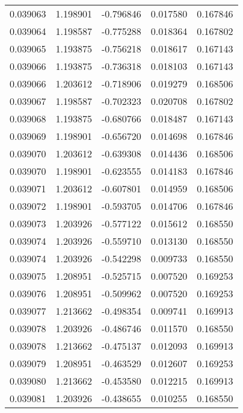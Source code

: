 \begin{tabular}{lrrrr}
0.039063    &  1.198901 & -0.796846 &  0.017580 &             0.167846 \\
0.039064    &  1.198587 & -0.775288 &  0.018364 &             0.167802 \\
0.039065    &  1.193875 & -0.756218 &  0.018617 &             0.167143 \\
0.039066    &  1.193875 & -0.736318 &  0.018103 &             0.167143 \\
0.039066    &  1.203612 & -0.718906 &  0.019279 &             0.168506 \\
0.039067    &  1.198587 & -0.702323 &  0.020708 &             0.167802 \\
0.039068    &  1.193875 & -0.680766 &  0.018487 &             0.167143 \\
0.039069    &  1.198901 & -0.656720 &  0.014698 &             0.167846 \\
0.039070    &  1.203612 & -0.639308 &  0.014436 &             0.168506 \\
0.039070    &  1.198901 & -0.623555 &  0.014183 &             0.167846 \\
0.039071    &  1.203612 & -0.607801 &  0.014959 &             0.168506 \\
0.039072    &  1.198901 & -0.593705 &  0.014706 &             0.167846 \\
0.039073    &  1.203926 & -0.577122 &  0.015612 &             0.168550 \\
0.039074    &  1.203926 & -0.559710 &  0.013130 &             0.168550 \\
0.039074    &  1.203926 & -0.542298 &  0.009733 &             0.168550 \\
0.039075    &  1.208951 & -0.525715 &  0.007520 &             0.169253 \\
0.039076    &  1.208951 & -0.509962 &  0.007520 &             0.169253 \\
0.039077    &  1.213662 & -0.498354 &  0.009741 &             0.169913 \\
0.039078    &  1.203926 & -0.486746 &  0.011570 &             0.168550 \\
0.039078    &  1.213662 & -0.475137 &  0.012093 &             0.169913 \\
0.039079    &  1.208951 & -0.463529 &  0.012607 &             0.169253 \\
0.039080    &  1.213662 & -0.453580 &  0.012215 &             0.169913 \\
0.039081    &  1.203926 & -0.438655 &  0.010255 &             0.168550 \\

\end{tabular}
